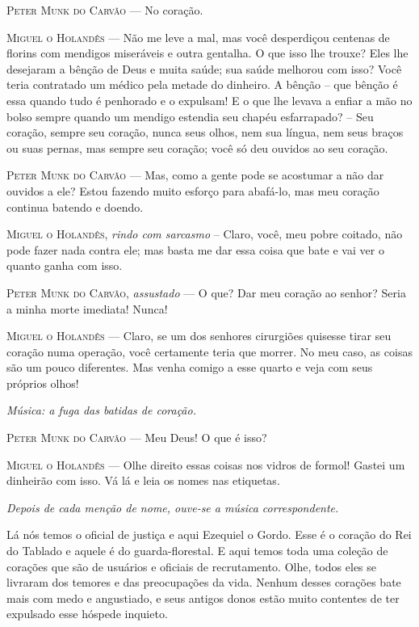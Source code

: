 \textsc{Peter Munk do Carvão} --- No coração.

\textsc{Miguel o Holandês} --- Não me leve a mal, mas você desperdiçou centenas de
florins com mendigos miseráveis e outra gentalha. O que isso lhe trouxe?
Eles lhe desejaram a bênção de Deus e muita saúde; sua saúde melhorou
com isso? Você teria contratado um médico pela metade do dinheiro. A
bênção -- que bênção é essa quando tudo é penhorado e o expulsam! E o
que lhe levava a enfiar a mão no bolso sempre quando um mendigo estendia
seu chapéu esfarrapado? -- Seu coração, sempre seu coração, nunca seus
olhos, nem sua língua, nem seus braços ou suas pernas, mas sempre seu
coração; você só deu ouvidos ao seu coração.

\textsc{Peter Munk do Carvão} --- Mas, como a gente pode se acostumar a não dar
ouvidos a ele? Estou fazendo muito esforço para abafá-lo, mas meu
coração continua batendo e doendo.

\textsc{Miguel o Holandês}, \emph{rindo com sarcasmo} -- Claro, você, meu pobre
coitado, não pode fazer nada contra ele; mas basta me dar essa coisa que
bate e vai ver o quanto ganha com isso.

\textsc{Peter Munk do Carvão}, \emph{assustado} --- O que? Dar meu coração ao
senhor? Seria a minha morte imediata! Nunca!

\textsc{Miguel o Holandês} --- Claro, se um dos senhores cirurgiões quisesse tirar
seu coração numa operação, você certamente teria que morrer. No meu
caso, as coisas são um pouco diferentes. Mas venha comigo a esse quarto
e veja com seus próprios olhos!

\emph{Música: a fuga das batidas de coração.}

\textsc{Peter Munk do Carvão} --- Meu Deus! O que é isso?

\textsc{Miguel o Holandês} --- Olhe direito essas coisas nos vidros de formol!
Gastei um dinheirão com isso. Vá lá e leia os nomes nas etiquetas.

\emph{Depois de cada menção de nome, ouve-se a música correspondente.}

Lá nós temos o oficial de justiça e aqui Ezequiel o Gordo. Esse é o
coração do Rei do Tablado e aquele é do guarda-florestal. E aqui temos
toda uma coleção de corações que são de usuários e oficiais de
recrutamento. Olhe, todos eles se livraram dos temores e das
preocupações da vida. Nenhum desses corações bate mais com medo e
angustiado, e seus antigos donos estão muito contentes de ter expulsado
esse hóspede inquieto.


